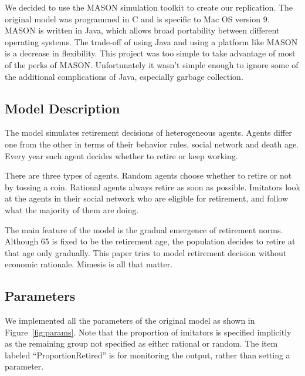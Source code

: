\documentclass[runningheads,a4paper]{article}
\begin{document}
We decided to use the MASON simulation toolkit \cite{luke2005mason} to create our replication. 
The original model was programmed in C and is specific to Mac OS version 9. 
MASON is written in Java, which allows broad portability between different operating systems.
The trade-off of using Java and using a platform like MASON is a decrease in flexibility.
This project was too simple to take advantage of most of the perks of MASON.
Unfortunately it wasn't simple enough to ignore some of the additional complications of Java, especially garbage collection.

\subsection{Model Description}

The model simulates retirement decisions of heterogeneous agents.
Agents differ one from the other in terms of their behavior rules, social network and death age.
Every year each agent decides whether to retire or keep working. 

There are three types of agents.
Random agents choose whether to retire or not by tossing a coin.
Rational agents always retire as soon as possible.
Imitators look at the agents in their social network who are eligible for retirement, and follow what the majority of them are doing.

The main feature of the model is the gradual emergence of retirement norms.
Although 65 is fixed to be the retirement age, the population decides to retire at that age only gradually.
This paper tries to model retirement decision without economic rationale.
Mimesis is all that matter.

\subsection{Parameters}

We implemented all the parameters of the original model as shown in Figure~\ref{fig:params}. 
Note that the proportion of imitators is specified implicitly as the remaining group not specified as either rational or random.
The item labeled ``ProportionRetired'' is for monitoring the output, rather than setting a parameter.
\end{document}
